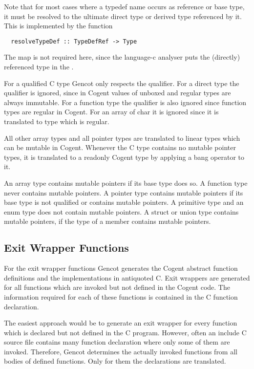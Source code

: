Note that for most cases where a typedef name occurs as reference or base type, it must be resolved to
the ultimate direct type or derived type referenced by it. This is implemented by the function
\begin{verbatim}
  resolveTypeDef :: TypeDefRef -> Type 
\end{verbatim}
The  map is not required here, since the language-c analyser puts the (directly) 
referenced type in the . 

For a qualified C type Gencot only respects the  qualifier. For a direct type the 
qualifier is ignored, since in Cogent values of unboxed and regular types are always immutable. For
a function type the qualifier is also ignored since function types are regular in Cogent. For an array
of char it is ignored since it is translated to type  which is regular.

All other array types and all pointer types are translated to linear types which can be mutable in
Cogent. Whenever the C type contains no mutable pointer types, it is translated to a readonly Cogent type by 
applying a bang operator to it.

An array type contains mutable pointers if its base type does so. A function type never contains mutable pointers.
A pointer type contains mutable pointers if its base type is not  qualified or contains mutable pointers.
A primitive type and an enum type does not contain mutable pointers. A struct or union type contains mutable 
pointers, if the type of a member contains mutable pointers.

\subsection{Exit Wrapper Functions}
\label{impl-comps-exitabs}

For the exit wrapper functions Gencot generates the Cogent abstract function definitions and the implementations
in antiquoted C. Exit wrappers are generated for all functions which are invoked but not defined in the Cogent code. 
The information required for each of these functions is contained in the C function declaration.

The easiest approach would be to generate an exit wrapper for every function which is declared but 
not defined in the C program. However, often an
include C source file contains many function declaration where only some of them are invoked. Therefore, Gencot
determines the actually invoked functions from all bodies of defined functions. Only for them the declarations
are translated.

